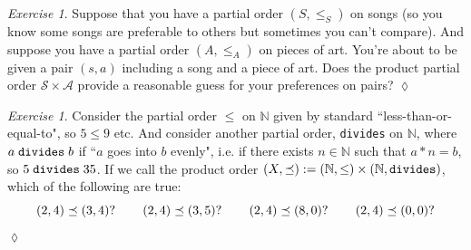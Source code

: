 \documentclass{book}
\def\mc{\mathcal}
\def\NN{{\mathbb N}}
\def\hsp{\hspace{.3in}}
\def\mcA{\mc{A}}
\def\mcS{\mc{S}}
\theoremstyle{remark}
\newtheorem{exc}[subsubsection]{Exercise}
\newenvironment{exercise}{\begin{exc}}{\hspace*{\fill}$\lozenge$\end{exc}}
\theoremstyle{definition}
\begin{document}
\begin{exercise}
Suppose that you have a partial order $(S,\leq_S)$ on songs (so you know some songs are preferable to others but sometimes you can't compare). And suppose you have a partial order $(A,\leq_A)$ on pieces of art. You're about to be given a pair $(s,a)$ including a song and a piece of art. Does the product partial order $\mcS\times\mcA$ provide a reasonable guess for your preferences on pairs?  
\end{exercise}

\begin{exercise}\label{exc:divides as po}
Consider the partial order $\leq$ on $\NN$ given by standard ``less-than-or-equal-to", so $5\leq 9$ etc. And consider another partial order, {\tt divides} on $\NN$, where $a\;{\tt divides}\;b$ if ``$a$ goes into $b$ evenly", i.e. if there exists $n\in\NN$ such that $a*n=b$, so $5\;{\tt divides}\;35$. If we call the product order $(X,\preceq):=(\NN,\leq)\times(\NN,{\tt divides})$, which of the following are true: 
$$(2,4)\preceq(3,4)? \hsp (2,4)\preceq(3,5)?\hsp (2,4)\preceq (8,0)?\hsp (2,4)\preceq(0,0)?$$
\end{exercise}
\end{document}
